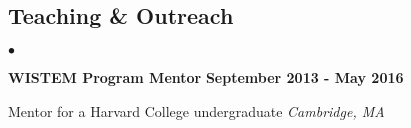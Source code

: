 \documentclass[margin,line]{res}
\newenvironment{list1}{
  \begin{list}{\ding{113}}{%
      \setlength{\itemsep}{0in}
      \setlength{\parsep}{0in} \setlength{\parskip}{0in}
      \setlength{\topsep}{0in} \setlength{\partopsep}{0in} 
      \setlength{\leftmargin}{0.17in}}}{\end{list}}
\newenvironment{list2}{
  \begin{list}{$\bullet$}{%
      \setlength{\itemsep}{0in}
      \setlength{\parsep}{0in} \setlength{\parskip}{0in}
      \setlength{\topsep}{0in} \setlength{\partopsep}{0in} 
      \setlength{\leftmargin}{0.2in}}}{\end{list}}
\begin{document}
\begin{resume}
%
%
%
%

\section{\sc Teaching \& Outreach}
\begin{list2}

\item[] {\bf WISTEM Program Mentor} \hfill {\bf September 2013 - May 2016}
\begin{list1}
\item[] Mentor for a Harvard College undergraduate \hfill \textit{Cambridge, MA}
\end{list1}


\end{list2}
\end{resume}
\end{document}
